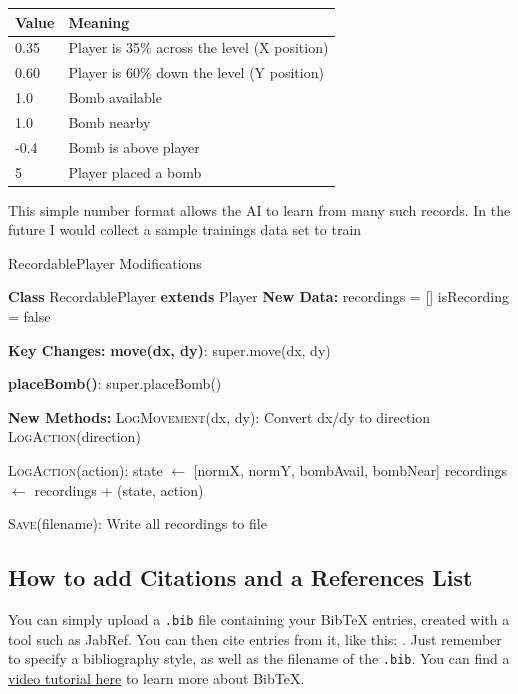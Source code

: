 \documentclass[sigconf]{acmart} %
\begin{document}
\begin{center}
	\begin{tabular}{|l|l|}
		\hline
		\textbf{Value} & \textbf{Meaning} \\ 
		\hline
		0.35 & Player is 35\% across the level (X position) \\ 
		0.60 & Player is 60\% down the level (Y position) \\ 
		1.0 & Bomb available \\ 
		1.0 & Bomb nearby \\ 
		-0.4 & Bomb is above player \\ 
		5 & Player placed a bomb \\ 
		\hline
	\end{tabular}
\end{center}

This simple number format allows the AI to learn from many such records. In the future I would collect a sample trainings data set to train 

\begin{algorithm}[t]
	\caption{RecordablePlayer Modifications}
	\label{alg:recording}
	\DontPrintSemicolon
	
	\textbf{Class} RecordablePlayer \textbf{extends} Player\;
	\nl\textbf{New Data:} 
	recordings = [] \;
	isRecording = false 
	
	\BlankLine
	\nl\textbf{Key Changes:}\;
	\nl \textbf{move(dx, dy)}:
	super.move(dx, dy)\;
	
	\nl \textbf{placeBomb()}:
	super.placeBomb()\;
	
	\BlankLine
	\nl\textbf{New Methods:}\;
	\nl\textsc{LogMovement}(dx, dy):
	Convert dx/dy to direction\;
	\textsc{LogAction}(direction)\;
	
	\nl\textsc{LogAction}(action):
	state $\leftarrow$ [normX, normY, bombAvail, bombNear]\;
	recordings $\leftarrow$ recordings + (state, action)\;
	
	\nl\textsc{Save}(filename):
	Write all recordings to file\;
\end{algorithm}
\subsection{How to add Citations and a References List}

You can simply upload a \verb|.bib| file containing your BibTeX entries, created with a tool such as JabRef. You can then cite entries from it, like this: \cite{greenwade93}. Just remember to specify a bibliography style, as well as the filename of the \verb|.bib|. You can find a \href{https://www.overleaf.com/help/97-how-to-include-a-bibliography-using-bibtex}{video tutorial here} to learn more about BibTeX.
\end{document}
